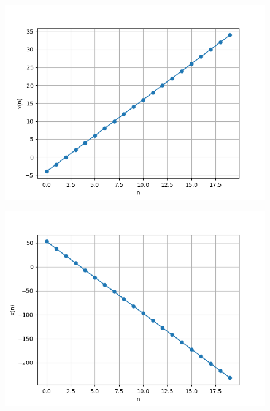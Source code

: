 \documentclass[journal,12pt,twocolumn]{IEEEtran}
\theoremstyle{remark}
\begin{document}
\begin{figure}[h] 
      \centering
       \includegraphics[width=1\linewidth]{figs/download (3).png} %
        \caption{}
    \end{figure}
    
\begin{figure}[h]
      \centering
       \includegraphics[width=1\linewidth]{figs/download (4).png} %
        \caption{}
\end{figure}
\end{document}
